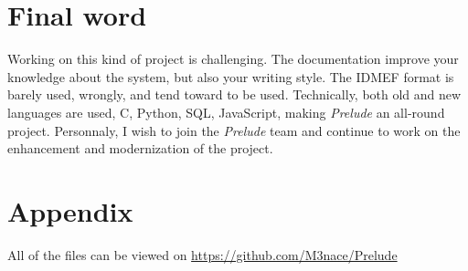 \documentclass{koala-en}
\begin{document}
\chapter{Final word}

Working on this kind of project is challenging. The documentation improve your knowledge about the system, but also your writing style. The IDMEF format is barely used, wrongly, and tend toward to be used. Technically, both old and new languages are used, C, Python, SQL, JavaScript, making \emph{Prelude} an all-round project.
\newline
\newline
Personnaly, I wish to join the \emph{Prelude} team and continue to work on the enhancement and modernization of the project.

\thispagestyle{fancy}
\newpage

\printglossary[style=altlisthypergroup]
\thispagestyle{fancy}

\chapter{Appendix}

All of the files can be viewed on \url{https://github.com/M3nace/Prelude}
\end{document}
